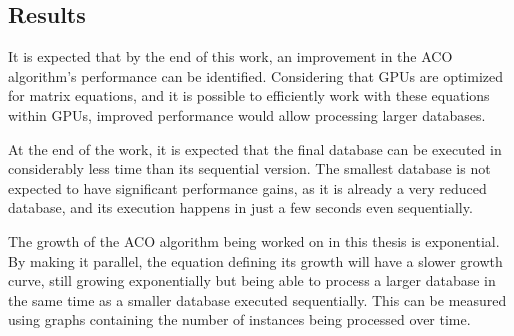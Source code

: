 \subsection{Results} \label{Results}

It is expected that by the end of this work, an improvement in the ACO algorithm's performance can be identified. Considering that GPUs are optimized for matrix equations, and it is possible to efficiently work with these equations within GPUs, improved performance would allow processing larger databases.

At the end of the work, it is expected that the final database can be executed in considerably less time than its sequential version. The smallest database is not expected to have significant performance gains, as it is already a very reduced database, and its execution happens in just a few seconds even sequentially.

The growth of the ACO algorithm being worked on in this thesis is exponential. By making it parallel, the equation defining its growth will have a slower growth curve, still growing exponentially but being able to process a larger database in the same time as a smaller database executed sequentially. This can be measured using graphs containing the number of instances being processed over time.
